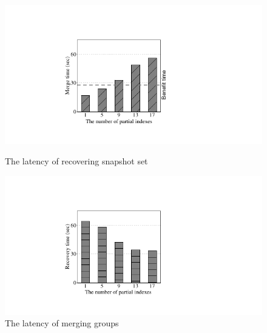 \documentclass[sigconf, nonacm]{acmart}
\begin{document}
\vspace{-0.3cm}
\begin{figure}[htbp]
	\begin{minipage}[t]{0.45\linewidth}
		\includegraphics[width=\linewidth]{figures/ceph_pic/eval_merge.pdf} 
		\caption{The latency of recovering snapshot set} 
		\label{fig:merge}
	\end{minipage}%
	\hfill%
	\begin{minipage}[t]{0.45\linewidth}
		\includegraphics[width=\linewidth]{figures/ceph_pic/eval_merge_recovery.pdf}
		\caption{The latency of merging groups}
		\label{fig:merge_recovery}
	\end{minipage} 
\end{figure}
\vspace{-0.3cm}
\end{document}
